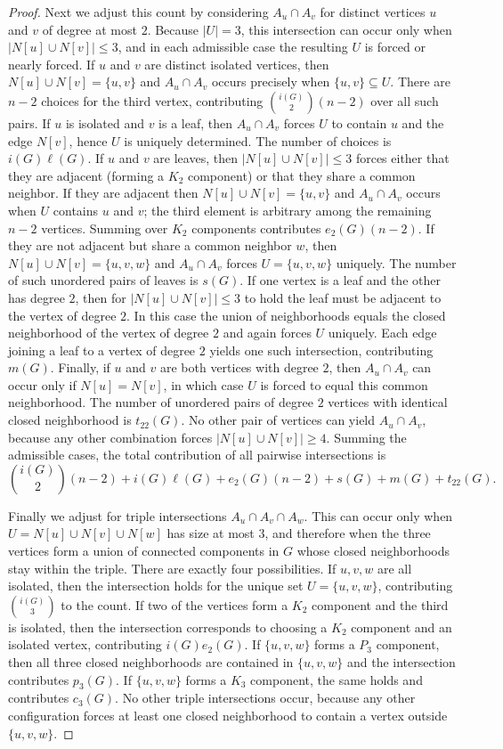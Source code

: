 \documentclass[11pt]{amsart}
\numberwithin{equation}{section}
\begin{document}
\begin{proof}
Next we adjust this count by considering $A_u\cap A_v$ for distinct vertices $u$ and $v$ of degree at most $2$. Because $|U|=3$, this intersection can occur only when $|N[u]\cup N[v]|\le 3$, and in each admissible case the resulting $U$ is forced or nearly forced. If $u$ and $v$ are distinct isolated vertices, then $N[u]\cup N[v]=\{u,v\}$ and $A_u\cap A_v$ occurs precisely when $\{u,v\}\subseteq U$. There are $n-2$ choices for the third vertex, contributing $\binom{i(G)}{2}(n-2)$ over all such pairs. If $u$ is isolated and $v$ is a leaf, then $A_u\cap A_v$ forces $U$ to contain $u$ and the edge $N[v]$, hence $U$ is uniquely determined. The number of choices is $i(G)\ell(G)$. If $u$ and $v$ are leaves, then $|N[u]\cup N[v]|\le 3$ forces either that they are adjacent (forming a $K_2$ component) or that they share a common neighbor. If they are adjacent then $N[u]\cup N[v]=\{u,v\}$ and $A_u\cap A_v$ occurs when $U$ contains $u$ and $v$; the third element is arbitrary among the remaining $n-2$ vertices. Summing over $K_2$ components contributes $e_2(G)(n-2)$. If they are not adjacent but share a common neighbor $w$, then $N[u]\cup N[v]=\{u,v,w\}$ and $A_u\cap A_v$ forces $U=\{u,v,w\}$ uniquely. The number of such unordered pairs of leaves is $s(G)$. If one vertex is a leaf and the other has degree $2$, then for $|N[u]\cup N[v]|\le 3$ to hold the leaf must be adjacent to the vertex of degree $2$. In this case the union of neighborhoods equals the closed neighborhood of the vertex of degree $2$ and again forces $U$ uniquely. Each edge joining a leaf to a vertex of degree $2$ yields one such intersection, contributing $m(G)$. Finally, if $u$ and $v$ are both vertices with degree $2$, then $A_u\cap A_v$ can occur only if $N[u]=N[v]$, in which case $U$ is forced to equal this common neighborhood. The number of unordered pairs of degree $2$ vertices with identical closed neighborhood is $t_{22}(G)$. No other pair of vertices can yield $A_u\cap A_v$, because any other combination forces $|N[u]\cup N[v]|\ge 4$. Summing the admissible cases, the total contribution of all pairwise intersections is
\[
\binom{i(G)}{2}(n-2)+i(G)\ell(G)+e_2(G)(n-2)+s(G)+m(G)+t_{22}(G).
\]

Finally we adjust for triple intersections $A_u\cap A_v\cap A_w$. This can occur only when $U=N[u]\cup N[v]\cup N[w]$ has size at most $3$, and therefore when the three vertices form a union of connected components in $G$ whose closed neighborhoods stay within the triple. There are exactly four possibilities. If $u,v,w$ are all isolated, then the intersection holds for the unique set $U=\{u,v,w\}$, contributing $\binom{i(G)}{3}$ to the count. If two of the vertices form a $K_2$ component and the third is isolated, then the intersection corresponds to choosing a $K_2$ component and an isolated vertex, contributing $i(G)e_2(G)$. If $\{u,v,w\}$ forms a $P_3$ component, then all three closed neighborhoods are contained in $\{u,v,w\}$ and the intersection contributes $p_3(G)$. If $\{u,v,w\}$ forms a $K_3$ component, the same holds and contributes $c_3(G)$. No other triple intersections occur, because any other configuration forces at least one closed neighborhood to contain a vertex outside $\{u,v,w\}$.


\end{proof}
\end{document}
